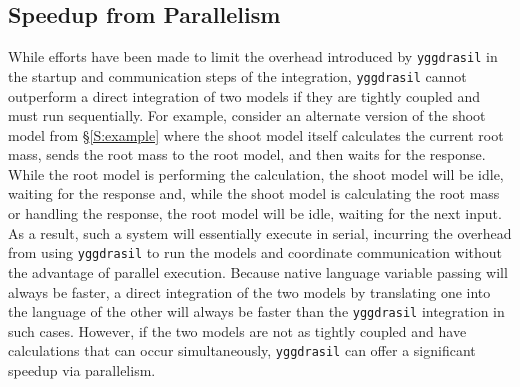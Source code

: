\documentclass[journal]{IEEEtran}
\newcommand{\pkg}{{\tt yggdrasil}{}}
\begin{document}
\subsection{Speedup from Parallelism}\label{SS:speedup}
%
While efforts have been made to limit the overhead introduced by {\pkg} in the startup and communication steps of the integration, {\pkg} cannot outperform a direct integration of two models if they are tightly coupled and must run sequentially. For example, consider an alternate version of the shoot model from \S\ref{S:example} where the shoot model itself calculates the current root mass, sends the root mass to the root model, and then waits for the response. While the root model is performing the calculation, the shoot model will be idle, waiting for the response and, while the shoot model is calculating the root mass or handling the response, the root model will be idle, waiting for the next input. As a result, such a system will essentially execute in serial, incurring the overhead from using {\pkg} to run the models and coordinate communication without the advantage of parallel execution. Because native language variable passing will always be faster, a direct integration of the two models by translating one into the language of the other will always be faster than the {\pkg} integration in such cases. However, if the two models are not as tightly coupled and have calculations that can occur simultaneously, {\pkg} can offer a significant speedup via parallelism.
\end{document}
